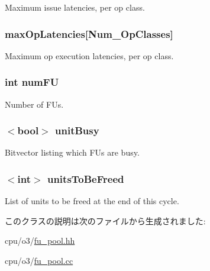 \label{classFUPool_ae3464c4dc458673d68839affdb919eeb}
Maximum issue latencies, per op class. \hypertarget{classFUPool_ac999d6f818bb8f54b6519e85a5369e25}{
\subsubsection[{maxOpLatencies}]{ {\bf maxOpLatencies}\mbox{[}{\bf Num\_\-OpClasses}\mbox{]}}}
\label{classFUPool_ac999d6f818bb8f54b6519e85a5369e25}
Maximum op execution latencies, per op class. \hypertarget{classFUPool_ae0b3cf4db09e8c26c2ab03dbe18bfb19}{
\subsubsection[{numFU}]{\setlength{\rightskip}{0pt plus 5cm}int {\bf numFU}}}
\label{classFUPool_ae0b3cf4db09e8c26c2ab03dbe18bfb19}
Number of FUs. \hypertarget{classFUPool_a3161f36ae7f93643b75fc37c7a1b0e23}{
\subsubsection[{unitBusy}]{$<$bool$>$ {\bf unitBusy}}}
\label{classFUPool_a3161f36ae7f93643b75fc37c7a1b0e23}
Bitvector listing which FUs are busy. \hypertarget{classFUPool_aa2972d7a97b76cc15ec7bbd38e5c9da5}{
\subsubsection[{unitsToBeFreed}]{$<$int$>$ {\bf unitsToBeFreed}}}
\label{classFUPool_aa2972d7a97b76cc15ec7bbd38e5c9da5}
List of units to be freed at the end of this cycle. 

このクラスの説明は次のファイルから生成されました:\begin{DoxyCompactItemize}
\item 
cpu/o3/\hyperlink{fu__pool_8hh}{fu\_\-pool.hh}\item 
cpu/o3/\hyperlink{fu__pool_8cc}{fu\_\-pool.cc}\end{DoxyCompactItemize}
